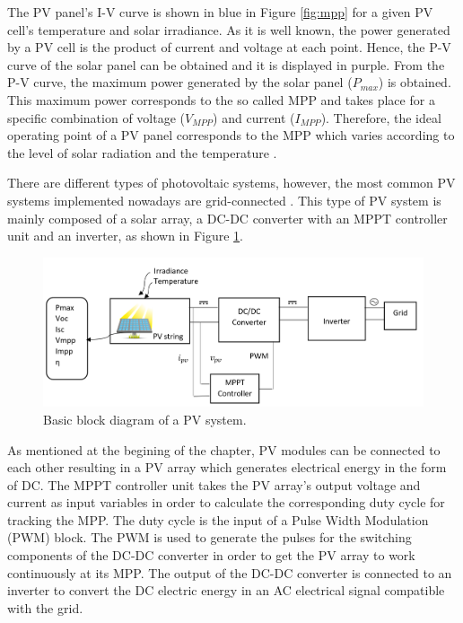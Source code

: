 The PV panel's I-V curve is shown in blue in Figure \ref{fig:mpp}
 for a given PV cell's temperature and solar irradiance. As it is well known, the power generated by a PV cell is the product of current and voltage at each point. Hence, the P-V curve of the solar panel can be obtained and it is displayed in purple. From the P-V curve, the maximum power generated by the solar panel ($P_{max}$) is obtained. This maximum power corresponds to the so called MPP and takes place for a specific combination of voltage ($V_{MPP}$) and current ($I_{MPP}$). Therefore, the ideal operating point of a PV panel corresponds to the MPP which varies according to the level of solar radiation and the temperature \cite{handbook}. 

There are different types of photovoltaic systems, however, the most common PV systems implemented nowadays are grid-connected \cite{handbook}. This type of PV system is mainly composed of a solar array, a DC-DC converter with an MPPT controller unit and an inverter, as shown in Figure \ref{fig:PVsystemblocks}. 

\begin{figure}[htbp]
	\includegraphics[width=\linewidth]{../Pictures/PV_system_blocks}
	\caption{Basic block diagram of a PV system.}
	\label{fig:PVsystemblocks}
\end{figure}

As mentioned at the begining of the chapter, PV modules can be connected to each other resulting in a PV array which generates electrical energy in the form of DC. The MPPT controller unit takes the PV array's output voltage and current as input variables in order to calculate the corresponding duty cycle for tracking the MPP. The duty cycle is the input of a Pulse Width Modulation (PWM) block. The PWM is used to generate the pulses for the switching components of the DC-DC converter in order to get the PV array to work continuously at its MPP. The output of the DC-DC converter is connected to an inverter to convert the DC electric energy in an AC electrical signal compatible with the grid.\cite{handbook}